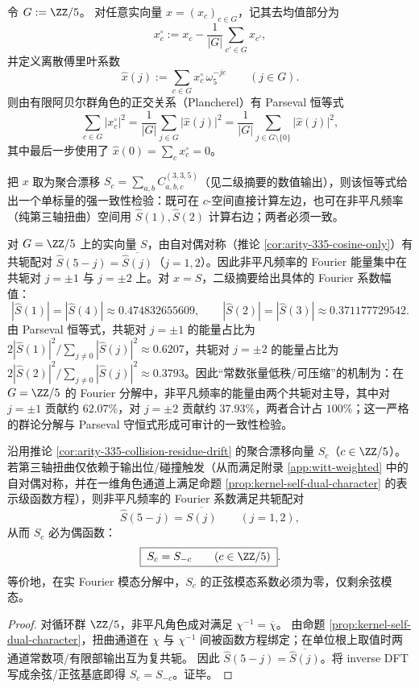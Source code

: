 \begin{remark}\label{rem:arity-335-parseval-bias}
令 \(G:=\ZZ/5\)。
对任意实向量 \(x=(x_c)_{c\in G}\)，记其去均值部分为
\[
x_c^\circ:=x_c-\frac{1}{|G|}\sum_{c'\in G}x_{c'},
\]
并定义离散傅里叶系数
\[
\widehat x(j):=\sum_{c\in G}x_c^\circ\,\omega_5^{-jc}\qquad(j\in G).
\]
则由有限阿贝尔群角色的正交关系（Plancherel）有 Parseval 恒等式
\[
\sum_{c\in G}\bigl|x_c^\circ\bigr|^2
=\frac{1}{|G|}\sum_{j\in G}\bigl|\widehat x(j)\bigr|^2
=\frac{1}{|G|}\sum_{j\in G\setminus\{0\}}\bigl|\widehat x(j)\bigr|^2,
\]
其中最后一步使用了 \(\widehat x(0)=\sum_c x_c^\circ=0\)。
\par
把 \(x\) 取为聚合漂移 \(S_c=\sum_{a,b}C^{(3,3,5)}_{a,b,c}\)（见二级摘要的数值输出），则该恒等式给出一个单标量的强一致性检验：既可在 \(c\)-空间直接计算左边，也可在非平凡频率（纯第三轴扭曲）空间用 \(\widehat S(1),\widehat S(2)\) 计算右边；两者必须一致。
\par
对 \(G=\ZZ/5\) 上的实向量 \(S\)，由自对偶对称（推论 \ref{cor:arity-335-cosine-only}）有共轭配对 \(\widehat S(5-j)=\overline{\widehat S(j)}\)（\(j=1,2\)）。因此非平凡频率的 Fourier 能量集中在共轭对 \(j=\pm 1\) 与 \(j=\pm 2\) 上。对 \(x=S\)，二级摘要给出具体的 Fourier 系数幅值：
\[
|\widehat S(1)|=|\widehat S(4)|\approx 0.474832655609,\qquad |\widehat S(2)|=|\widehat S(3)|\approx 0.371177729542.
\]
由 Parseval 恒等式，共轭对 \(j=\pm 1\) 的能量占比为 \(2|\widehat S(1)|^2/\sum_{j\neq 0}|\widehat S(j)|^2\approx 0.6207\)，共轭对 \(j=\pm 2\) 的能量占比为 \(2|\widehat S(2)|^2/\sum_{j\neq 0}|\widehat S(j)|^2\approx 0.3793\)。因此``常数张量低秩/可压缩''的机制为：在 \(G=\ZZ/5\) 的 Fourier 分解中，非平凡频率的能量由两个共轭对主导，其中对 \(j=\pm 1\) 贡献约 \(62.07\%\)，对 \(j=\pm 2\) 贡献约 \(37.93\%\)，两者合计占 \(100\%\)；这一严格的群论分解与 Parseval 守恒式形成可审计的一致性检验。
\end{remark}

\begin{corollary}\label{cor:arity-335-cosine-only}
沿用推论 \ref{cor:arity-335-collision-residue-drift} 的聚合漂移向量 \(S_c\)（\(c\in\ZZ/5\)）。
若第三轴扭曲仅依赖于输出位/碰撞触发（从而满足附录 \ref{app:witt-weighted} 中的自对偶对称，并在一维角色通道上满足命题 \ref{prop:kernel-self-dual-character} 的表示级函数方程），则非平凡频率的 Fourier 系数满足共轭配对
\[
\widehat S(5-j)=\overline{\widehat S(j)}\qquad(j=1,2),
\]
从而 \(S_c\) 必为偶函数：
\[
\boxed{\;
S_c=S_{-c}\qquad(c\in\ZZ/5)\; }.
\]
等价地，在实 Fourier 模态分解中，\(S_c\) 的正弦模态系数必须为零，仅剩余弦模态。
\end{corollary}
\begin{proof}
对循环群 \(\ZZ/5\)，非平凡角色成对满足 \(\chi^{-1}=\overline{\chi}\)。
由命题 \ref{prop:kernel-self-dual-character}，扭曲通道在 \(\chi\) 与 \(\chi^{-1}\) 间被函数方程绑定；在单位根上取值时两通道常数项/有限部输出互为复共轭。
因此 \(\widehat S(5-j)=\overline{\widehat S(j)}\)。将 inverse DFT 写成余弦/正弦基底即得 \(S_c=S_{-c}\)。证毕。
\end{proof}

